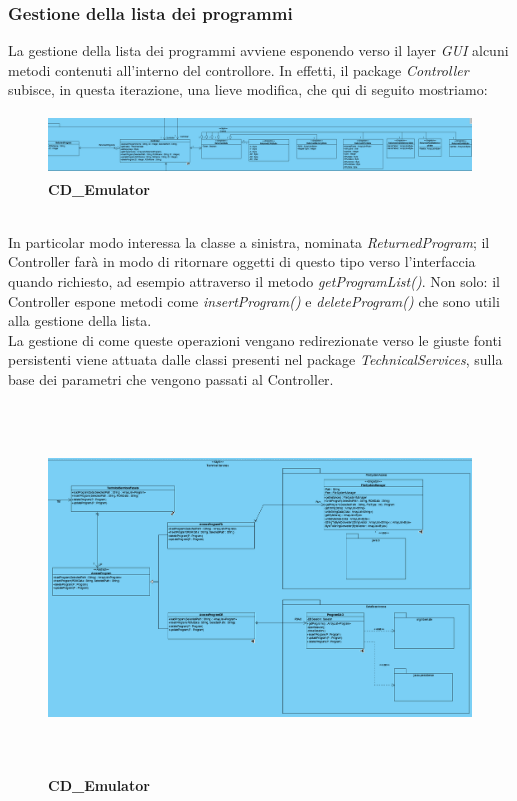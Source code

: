 \documentclass[11pt]{article}
\begin{document}
\subsubsection{Gestione della lista dei programmi}
La gestione della lista dei programmi avviene esponendo verso il layer \emph{GUI} alcuni metodi contenuti all'interno del controllore. In effetti, il package \emph{Controller} subisce, in questa iterazione, una lieve modifica, che qui di seguito mostriamo:
\begin{figure}[h]
\hspace*{-2.7cm}
\centering
\includegraphics[width=500px, height=61px]{CD_Emulator_7.png}\\
\small\textbf{CD\_Emulator}
\end{figure}\\
In particolar modo interessa la classe a sinistra, nominata \emph{ReturnedProgram}; il Controller farà in modo di ritornare oggetti di questo tipo verso l'interfaccia quando richiesto, ad esempio attraverso il metodo \emph{getProgramList()}. Non solo: il Controller espone metodi come \emph{insertProgram()} e \emph{deleteProgram()} che sono utili alla gestione della lista.\\
La gestione di come queste operazioni vengano redirezionate verso le giuste fonti persistenti viene attuata dalle classi presenti nel package \emph{TechnicalServices}, sulla base dei parametri che vengono passati al Controller.
\begin{figure}[h]
\hspace*{-4.2cm}
\centering
\includegraphics[width=600px, height=368px]{CD_Emulator_8.png}\\
\small\textbf{CD\_Emulator}
\end{figure}\\
\end{document}
